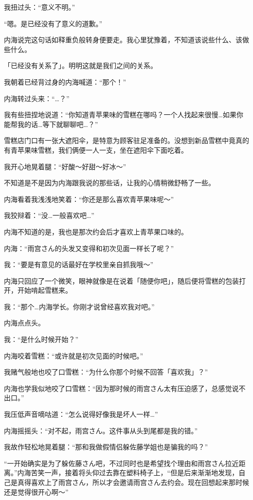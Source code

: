 我扭过头：“意义不明。”

“嗯。是已经没有了意义的道歉。”

内海说完这句话如释重负般转身便要走。我心里犹豫着，不知道该说些什么、该做些什么。

「已经没有关系了」。明明这就是我们之间的关系。

我朝着已经背过身的内海喊道：“那个！”

内海转过头来：“…？”

我有些扭捏地说道：“你知道青苹果味的雪糕在哪吗？一个人找起来很慢…如果你能帮我的话…等下就聊聊吧…？”

雪糕店门口有一张大遮阳伞，是特意为顾客驻足准备的。没想到新品雪糕中竟真的有青苹果味雪糕，我们俩便一人一支，坐在遮阳伞下面吃着。

我开心地晃着腿：“好酸～好甜～好冰～”

不知道是不是因为内海跟我说的那些话，让我的心情稍微舒畅了一些。

内海看着我浅浅地笑着：“你还是那么喜欢青苹果味呢～”

我狡辩着：“没…一般喜欢吧…”

内海不知道的是，我也是那次约会后才喜欢上青苹果口味的。

内海：“雨宫さん的头发又变得和初次见面一样长了呢？”

我：“要是有意见的话最好在学校里亲自抓我哦～”

内海只回应了一个微笑，眼神就像是在说着「随便你吧」，随后便将雪糕的包装打开，开始啃起雪糕来。

我：“那个…内海学长。你刚才说曾经喜欢我对吧。”

内海点点头。

我：“是什么时候开始？”

内海咬着雪糕：“或许就是初次见面的时候吧。”

我赌气般地也咬了口雪糕：“为什么你那个时候不回答「喜欢我」？”

内海也学我似地咬了口雪糕：“因为那时候的雨宫さん太有压迫感了，总感觉说不出口。”

我压低声音嘀咕道：“怎么说得好像我是坏人一样…”

内海摇摇头：“对不起，雨宫さん。这件事从头到尾都是我的错。”

我故作轻松地晃着腿：“那和我做假情侣躲佐藤学姐也是骗我的吗？”

“一开始确实是为了躲佐藤さん吧，不过同时也是希望找个理由和雨宫さん拉近距离。”内海苦笑一声，接着将头仰过去靠在塑料椅子上，“但是后来渐渐地发现，自己是真得喜欢上了雨宫さん，所以才会邀请雨宫さん去约会。现在回想起来那时候还是觉得很开心啊～”

